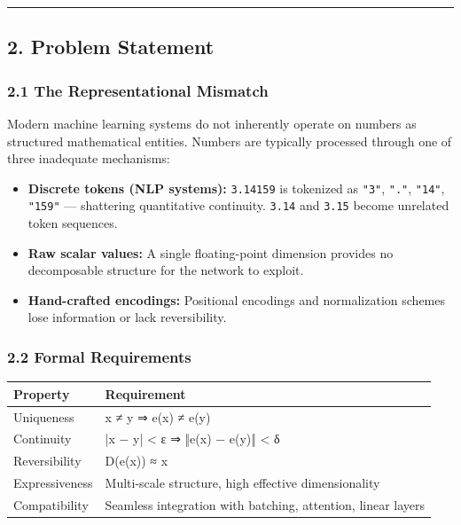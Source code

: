 \documentclass[11pt]{article}
\begin{document}
\noindent\rule{\textwidth}{0.4pt}


\subsection*{2. Problem Statement}


\subsubsection*{2.1 The Representational Mismatch}


Modern machine learning systems do not inherently operate on numbers as structured mathematical entities. Numbers are typically processed through one of three inadequate mechanisms:


\begin{itemize}
\item \textbf{Discrete tokens (NLP systems):} \texttt{3.14159} is tokenized as \texttt{"3"}, \texttt{"."}, \texttt{"14"}, \texttt{"159"} — shattering quantitative continuity. \texttt{3.14} and \texttt{3.15} become unrelated token sequences.
\item \textbf{Raw scalar values:} A single floating-point dimension provides no decomposable structure for the network to exploit.
\item \textbf{Hand-crafted encodings:} Positional encodings and normalization schemes lose information or lack reversibility.
\end{itemize}


\subsubsection*{2.2 Formal Requirements}


\begin{longtable}{|>{\raggedright\arraybackslash}p{}|>{\raggedright\arraybackslash}p{}|}
\hline
\textbf{Property} & \textbf{Requirement} \\ \hline
Uniqueness & x ≠ y ⇒ e(x) ≠ e(y) \\ \hline
Continuity & |x − y| < ε ⇒ ‖e(x) − e(y)‖ < δ \\ \hline
Reversibility & D(e(x)) ≈ x \\ \hline
Expressiveness & Multi-scale structure, high effective dimensionality \\ \hline
Compatibility & Seamless integration with batching, attention, linear layers \\ \hline
\end{longtable}
\end{document}

